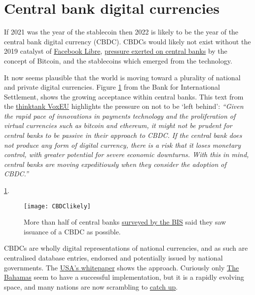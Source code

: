 \section{Central bank digital currencies}
If 2021 was the year of the stablecoin then 2022 is likely to be the year of the central bank digital currency (CBDC). CBDCs would likely not exist without the 2019 catalyst of \href{https://www.thetimes.co.uk/article/facebooks-libra-cryptocurrency-project-ends-in-failure-cxvnnc3kx}{Facebook Libre}, \href{https://www.theguardian.com/world/2021/jul/09/currency-and-control-why-china-wants-to-undermine-bitcoin}{pressure exerted on central banks} by the concept of Bitcoin, and the stablecoins which emerged from the technology.\par
It now seems plausible that the world is moving toward a plurality of national and private digital currencies. Figure \ref{fig:CBDClikely} from the Bank for International Settlement, shows the growing acceptance within central banks. This text from the \href{https://voxeu.org/article/benefits-central-bank-digital-currency}{thinktank VoxEU} highlights the pressure on not to be `left behind': \textit{``Given the rapid pace of innovations in payments technology and the proliferation of virtual currencies such as bitcoin and ethereum, it might not be prudent for central banks to be passive in their approach to CBDC. If the central bank does not produce any form of digital currency, there is a risk that it loses monetary control, with greater potential for severe economic downturns. With this in mind, central banks are moving expeditiously when they consider the adoption of CBDC.''}\par
\ref{fig:CBDClikely}.
\begin{figure}
  \centering
    \texttt{[image: CBDClikely]}
  \caption{More than half of central banks \href{https://www.bis.org/publ/bppdf/bispap125.htm}{surveyed by the BIS} said they saw issuance of a CBDC as possible.}
  \label{fig:CBDClikely}
\end{figure}
CBDCs are wholly digital representations of national currencies, and as such are centralised database entries, endorsed and potentially issued by national governments. The \href{https://www.federalreserve.gov/publications/files/money-and-payments-20220120.pdf}{USA's whitepaper} shows the approach. Curiously only \href{https://www.sanddollar.bs/about}{The Bahamas} seem to have a successful implementation, but it is a rapidly evolving space, and many nations are now scrambling to \href{https://twitter.com/GobiernoMX/status/1476376240873517061}{catch up}.\par
